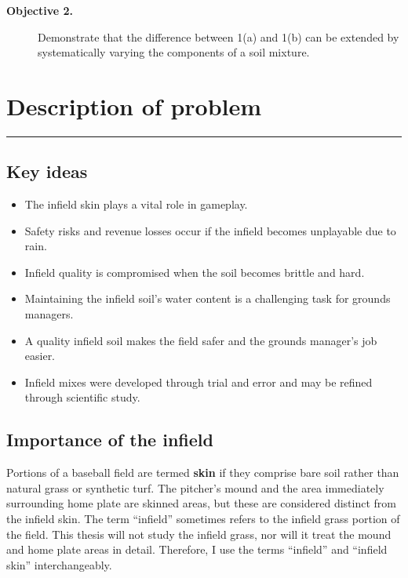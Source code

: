 \documentclass[
  letterpaper,
  openany]{book}
\providecommand{\tightlist}{%
  \setlength{\itemsep}{0pt}\setlength{\parskip}{0pt}}
\begin{document}
\begin{description}
\item[\textbf{Objective 2.}]
Demonstrate that the difference between 1(a) and 1(b) can be extended by systematically varying the components of a soil mixture.
\end{description}

\hypertarget{problem-description}{%
\chapter{Description of problem}\label{problem-description}}

\begin{center}\rule{0.5\linewidth}{0.5pt}\end{center}

\hypertarget{key-ideas}{%
\section{Key ideas}\label{key-ideas}}

\begin{itemize}
\tightlist
\item
  The infield skin plays a vital role in gameplay.
\item
  Safety risks and revenue losses occur if the infield becomes unplayable due to rain.
\item
  Infield quality is compromised when the soil becomes brittle and hard.
\item
  Maintaining the infield soil's water content is a challenging task for grounds managers.
\item
  A quality infield soil makes the field safer and the grounds manager's job easier.
\item
  Infield mixes were developed through trial and error and may be refined through scientific study.
\end{itemize}

\hypertarget{importance-of-the-infield}{%
\section{Importance of the infield}\label{importance-of-the-infield}}

Portions of a baseball field are termed \textbf{skin} if they comprise bare soil rather than natural grass or synthetic turf.
The pitcher's mound and the area immediately surrounding home plate are skinned areas, but these are considered distinct from the infield skin.
The term ``infield'' sometimes refers to the infield grass portion of the field.
This thesis will not study the infield grass, nor will it treat the mound and home plate areas in detail.
Therefore, I use the terms ``infield'' and ``infield skin'' interchangeably.
\end{document}
